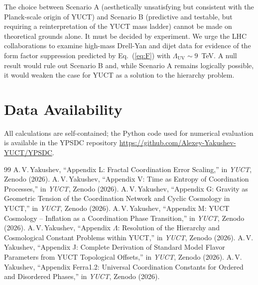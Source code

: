 \documentclass[12pt,a4paper]{article}
\newcommand{\LUV}{\Lambda_{\mathrm{UV}}}
\theoremstyle{remark}
\begin{document}
	The choice between Scenario A (aesthetically unsatisfying but consistent with the Planck-scale origin of YUCT) and Scenario B (predictive and testable, but requiring a reinterpretation of the YUCT mass ladder) cannot be made on theoretical grounds alone.  It must be decided by experiment.  We urge the LHC collaborations to examine high-mass Drell-Yan and dijet data for evidence of the form factor suppression predicted by Eq.~(\ref{eq:F}) with \(\LUV \sim 9\)~TeV.  A null result would rule out Scenario B and, while Scenario A remains logically possible, it would weaken the case for YUCT as a solution to the hierarchy problem.
	
	\section*{Data Availability}
	All calculations are self-contained; the Python code used for numerical evaluation is available in the YPSDC repository \url{https://github.com/Alexey-Yakushev-YUCT/YPSDC}.
	
	\begin{thebibliography}{99}
		 A.\,V.\,Yakushev, ``Appendix L: Fractal Coordination Error Scaling,'' in \emph{YUCT}, Zenodo (2026).
		 A.\,V.\,Yakushev, ``Appendix V: Time as Entropy of Coordination Processes,'' in \emph{YUCT}, Zenodo (2026).
		 A.\,V.\,Yakushev, ``Appendix G: Gravity as Geometric Tension of the Coordination Network and Cyclic Cosmology in YUCT,'' in \emph{YUCT}, Zenodo (2026).
		 A.\,V.\,Yakushev, ``Appendix M: YUCT Cosmology -- Inflation as a Coordination Phase Transition,'' in \emph{YUCT}, Zenodo (2026).
		 A.\,V.\,Yakushev, ``Appendix \(\Lambda\): Resolution of the Hierarchy and Cosmological Constant Problems within YUCT,'' in \emph{YUCT}, Zenodo (2026).
		 A.\,V.\,Yakushev, ``Appendix J: Complete Derivation of Standard Model Flavor Parameters from YUCT Topological Offsets,'' in \emph{YUCT}, Zenodo (2026).
		 A.\,V.\,Yakushev, ``Appendix Ferra1.2: Universal Coordination Constants for Ordered and Disordered Phases,'' in \emph{YUCT}, Zenodo (2026).
	\end{thebibliography}
	
\end{document}
